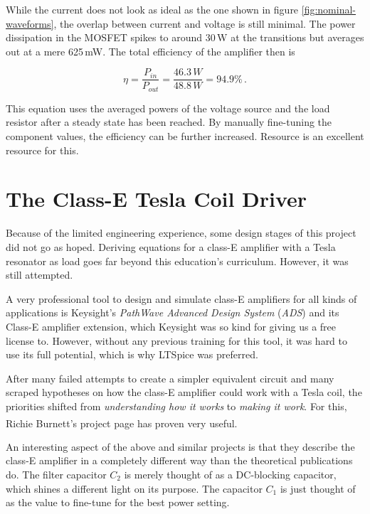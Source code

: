 While the current does not look as ideal as the one shown in figure \ref{fig:nominal-waveforms}, the overlap between current and voltage is still minimal. The power dissipation in the MOSFET spikes to around 30\,W at the transitions but averages out at a mere 625\,mW. The total efficiency of the amplifier then is

\begin{equation}
    \eta = \frac{P_{in}}{P_{out}} = \frac{46.3\,W}{48.8\,W} = 94.9\%\,.
\end{equation}

This equation uses the averaged powers of the voltage source and the load resistor after a steady state has been reached. By manually fine-tuning the component values, the efficiency can be further increased. Resource  is an excellent resource for this.

\section{The Class-E Tesla Coil Driver}

Because of the limited engineering experience, some design stages of this project did not go as hoped. Deriving equations for a class-E amplifier with a Tesla resonator as load goes far beyond this education's curriculum. However, it was still attempted.

A very professional tool to design and simulate class-E amplifiers for all kinds of applications is Keysight's \emph{PathWave Advanced Design System} (\emph{ADS}) and its Class-E amplifier extension, which Keysight was so kind for giving us a free license to. However, without any previous training for this tool, it was hard to use its full potential, which is why LTSpice was preferred.

After many failed attempts to create a simpler equivalent circuit and many scraped hypotheses on how the class-E amplifier could work with a Tesla coil, the priorities shifted from \emph{understanding how it works} to \emph{making it work}. For this, Richie Burnett's project page\textsuperscript{} has proven very useful.

An interesting aspect of the above and similar projects is that they describe the class-E amplifier in a completely different way than the theoretical publications do. The filter capacitor \(C_2\) is merely thought of as a DC-blocking capacitor, which shines a different light on its purpose. The capacitor \(C_1\) is just thought of as the value to fine-tune for the best power setting.

